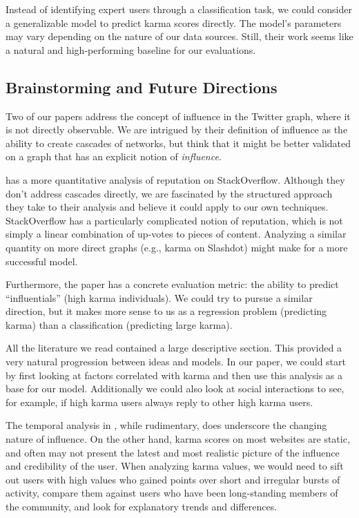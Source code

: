 \documentclass[10pt]{article}
\begin{document}
Instead of identifying expert users through a classification task, we could
consider a generalizable model to predict karma scores directly. The model's
parameters may vary depending on the nature of our data sources. Still, their
work seems like a natural and high-performing baseline for our evaluations. 

\subsection{Brainstorming and Future Directions}

Two of our papers address the concept of influence in the Twitter graph, where
it is not directly observable. We are intrigued by their definition of influence
as the ability to create cascades of networks, but think that it might be better
validated on a graph that has an explicit notion of \textit{influence}.

\citet{movshovitzanalysis} has a more quantitative analysis of reputation on
StackOverflow.  Although they don't address cascades directly, we are fascinated 
by the structured approach they take to their analysis and believe it could apply
to our own techniques.  StackOverflow has a particularly complicated
notion of reputation, which is not simply a linear combination of up-votes to
pieces of content. Analyzing a similar quantity on more direct graphs (e.g.,
karma on Slashdot) might make for a more successful model.

Furthermore, the paper has a concrete evaluation metric: the ability to predict
``influentials'' (high karma individuals). We could try to pursue a similar
direction, but it makes more sense to us as a regression problem (predicting
karma) than a classification (predicting large karma).

All the literature we read contained a large descriptive section. This provided
a very natural progression between ideas and models. In our paper, we could
start by first looking at factors correlated with karma and then use this
analysis as a base for our model. Additionally we could also look at social
interactions to see, for example, if high karma users always reply to other high
karma users.

The temporal analysis in \citet{cha2010measuring}, while rudimentary, does
underscore the changing nature of influence. On the other hand, karma scores on
most websites are static, and often may not present the latest and most
realistic picture of the influence and credibility of the user. 
When analyzing karma values, we would need to sift out users with high values
who gained points over short and irregular bursts of activity, compare them
against users who have been long-standing members of the community, and look for
explanatory trends and differences.
\end{document}
